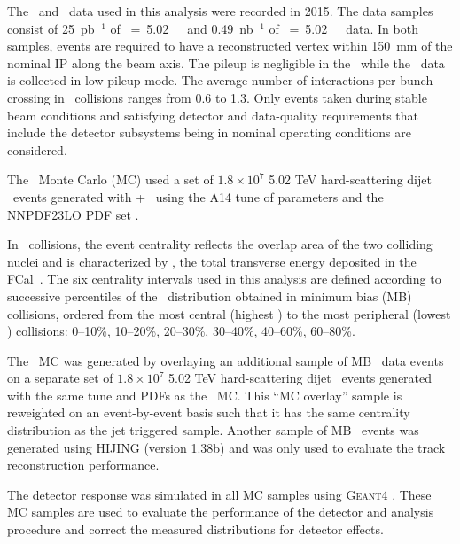 
The \PbPb\ and \pp\ data used in this analysis were recorded in 2015.
The data samples consist of 25~pb$^{-1}$ of \sqrts~=~5.02~\TeV\ \pp\ and 0.49~nb$^{-1}$ of \sqrtsnn~=~5.02~\TeV\ \pbpb\ data.
In both samples, events are required to have a reconstructed vertex within 150~mm of the nominal IP along the beam axis.
The pileup is negligible in the \pbpb\ while the \pp\ data is collected in low pileup mode.
The average number of interactions per bunch crossing in \pp\ collisions ranges from 0.6 to 1.3.
Only events taken during stable beam conditions and satisfying detector and data-quality requirements that include the detector subsystems being in nominal operating conditions are considered.

The \pp\ Monte Carlo (MC) used a set of $1.8\times10^7$ 5.02 TeV hard-scattering dijet \pp\ events generated with \powheg{}+\pythiaeight\ \cite{Nason:2004rx,Sjostrand:2014zea} using the A14 tune of parameters \cite{ATLAS2014021} and the NNPDF23LO PDF set \cite{Ball:2012cx}.

In \pbpb\ collisions, the event centrality reflects the overlap area of the two colliding nuclei and is characterized by \ETfcal, the total transverse energy deposited in the FCal~\cite{Aaboud:2017tql}.
The six centrality intervals used in this analysis are defined according to successive percentiles of the \ETfcal\ distribution obtained in minimum bias (MB) collisions, ordered from the most central (highest \ETfcal) to the most peripheral (lowest \ETfcal) collisions: 0--10\%, 10--20\%, 20--30\%, 30--40\%, 40--60\%, 60--80\%.

The \pbpb\ MC was generated by overlaying an additional sample of MB \pbpb\ data events on a separate set of $1.8\times10^7$ 5.02 TeV hard-scattering dijet \pp\ events generated with the same tune and PDFs as the \pp\ MC.
This ``MC overlay'' sample is reweighted on an event-by-event basis such that it has the same centrality distribution as the jet triggered sample.
Another sample of MB \pbpb\ events was generated using HIJING (version 1.38b) \cite{Wang:1991hta} and was only used to evaluate the track reconstruction performance.

The detector response was simulated in all MC samples using \textsc{Geant4} \cite{Agostinelli:2002hh,Aad:2010ah}. These MC samples are used to evaluate the performance of the detector and analysis procedure and correct the measured distributions for detector effects.



